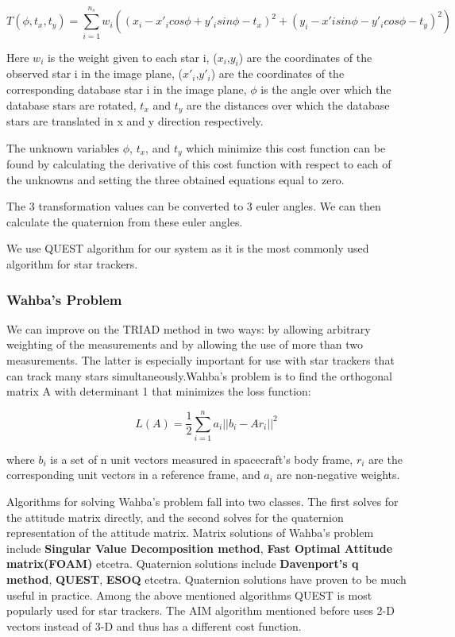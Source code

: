 {{{\begin{equation}
    T(\phi,t_{x},t_{y})=\sum_{i=1}^{n_{s}} w_{i}((x_{i}-x'_i cos\phi + y'_{i} sin\phi -t_{x})^{2}+(y_{i}-x'{i}sin\phi -y'_{i}cos\phi -t_y)^{2})
\end{equation}

Here $w_i$ is the weight given to each star i, ($x_i$,$y_i$) are the coordinates of the observed star i in the image plane, ($x'_i$,$y'_i$) are the coordinates of the corresponding database star i in the image plane, \(\phi\) is the
angle over which the database stars are rotated, $t_x$ and $t_y$ are the distances over which the database
stars are translated in x and y direction respectively.

The unknown variables \(\phi\), $t_x$, and $t_y$ which minimize this cost function can be found by calculating the
derivative of this cost function with respect to each of the unknowns and setting the three obtained equations equal to zero.

The 3 transformation values can be converted to 3 euler angles. We can then calculate the quaternion from these euler angles.

We use QUEST algorithm for our system as it is the most commonly used algorithm for star trackers. 

}


\subsubsection{Wahba's Problem}
{We can improve on the TRIAD method in two ways: by allowing arbitrary weighting
of the measurements and by allowing the use of more than two measurements. The latter is especially important for use with star trackers that can track many stars simultaneously.Wahba’s problem is to find the orthogonal matrix A with determinant 1 that minimizes the loss function:

\begin{equation}
    L(A)=\frac{1}{2} \sum_{i=1}^{n}a_{i}||b_{i}-Ar_{i}||^2
\end{equation}

where $b_i$ is a set of n unit vectors measured in spacecraft's body frame, $r_i$ are the corresponding unit vectors in a reference frame, and $a_i$ are non-negative
weights.

Algorithms for solving Wahba’s problem fall into two classes. The first solves for the attitude matrix directly, and the second solves for the quaternion representation of the attitude matrix. Matrix solutions of Wahba's problem include \textbf{Singular Value Decomposition method}, \textbf{Fast Optimal Attitude matrix(FOAM)} etcetra. Quaternion solutions include \textbf{Davenport's q method}, \textbf{QUEST}, \textbf{ESOQ} etcetra. Quaternion solutions have proven to be much useful in practice. Among the above mentioned algorithms QUEST is most popularly used for star trackers. The AIM algorithm mentioned before uses 2-D vectors instead of 3-D and thus has a different cost function.

}}}
